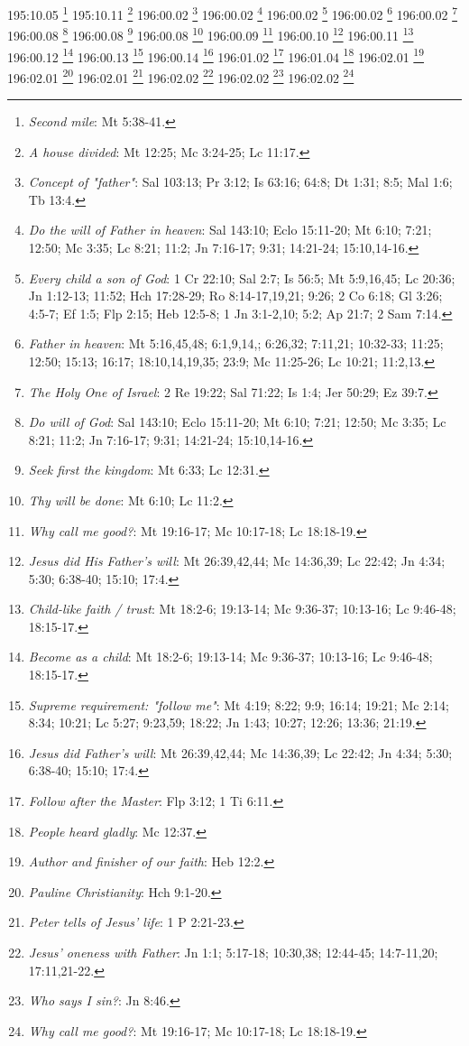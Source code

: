 195:10.05 \footnote{\textit{Second mile}: Mt 5:38-41.}
195:10.11 \footnote{\textit{A house divided}: Mt 12:25; Mc 3:24-25; Lc 11:17.}
196:00.02 \footnote{\textit{Concept of "father"}: Sal 103:13; Pr 3:12; Is 63:16; 64:8; Dt 1:31; 8:5; Mal 1:6; Tb 13:4.}
196:00.02 \footnote{\textit{Do the will of Father in heaven}: Sal 143:10; Eclo 15:11-20; Mt 6:10; 7:21; 12:50; Mc 3:35; Lc 8:21; 11:2; Jn 7:16-17; 9:31; 14:21-24; 15:10,14-16.}
196:00.02 \footnote{\textit{Every child a son of God}: 1 Cr 22:10; Sal 2:7; Is 56:5; Mt 5:9,16,45; Lc 20:36; Jn 1:12-13; 11:52; Hch 17:28-29; Ro 8:14-17,19,21; 9:26; 2 Co 6:18; Gl 3:26; 4:5-7; Ef 1:5; Flp 2:15; Heb 12:5-8; 1 Jn 3:1-2,10; 5:2; Ap 21:7; 2 Sam 7:14.}
196:00.02 \footnote{\textit{Father in heaven}: Mt 5:16,45,48; 6:1,9,14,; 6:26,32; 7:11,21; 10:32-33; 11:25; 12:50; 15:13; 16:17; 18:10,14,19,35; 23:9; Mc 11:25-26; Lc 10:21; 11:2,13.}
196:00.02 \footnote{\textit{The Holy One of Israel}: 2 Re 19:22; Sal 71:22; Is 1:4; Jer 50:29; Ez 39:7.}
196:00.08 \footnote{\textit{Do will of God}: Sal 143:10; Eclo 15:11-20; Mt 6:10; 7:21; 12:50; Mc 3:35; Lc 8:21; 11:2; Jn 7:16-17; 9:31; 14:21-24; 15:10,14-16.}
196:00.08 \footnote{\textit{Seek first the kingdom}: Mt 6:33; Lc 12:31.}
196:00.08 \footnote{\textit{Thy will be done}: Mt 6:10; Lc 11:2.}
196:00.09 \footnote{\textit{Why call me good?}: Mt 19:16-17; Mc 10:17-18; Lc 18:18-19.}
196:00.10 \footnote{\textit{Jesus did His Father's will}: Mt 26:39,42,44; Mc 14:36,39; Lc 22:42; Jn 4:34; 5:30; 6:38-40; 15:10; 17:4.}
196:00.11 \footnote{\textit{Child-like faith / trust}: Mt 18:2-6; 19:13-14; Mc 9:36-37; 10:13-16; Lc 9:46-48; 18:15-17.}
196:00.12 \footnote{\textit{Become as a child}: Mt 18:2-6; 19:13-14; Mc 9:36-37; 10:13-16; Lc 9:46-48; 18:15-17.}
196:00.13 \footnote{\textit{Supreme requirement: "follow me"}: Mt 4:19; 8:22; 9:9; 16:14; 19:21; Mc 2:14; 8:34; 10:21; Lc 5:27; 9:23,59; 18:22; Jn 1:43; 10:27; 12:26; 13:36; 21:19.}
196:00.14 \footnote{\textit{Jesus did Father's will}: Mt 26:39,42,44; Mc 14:36,39; Lc 22:42; Jn 4:34; 5:30; 6:38-40; 15:10; 17:4.}
196:01.02 \footnote{\textit{Follow after the Master}: Flp 3:12; 1 Ti 6:11.}
196:01.04 \footnote{\textit{People heard gladly}: Mc 12:37.}
196:02.01 \footnote{\textit{Author and finisher of our faith}: Heb 12:2.}
196:02.01 \footnote{\textit{Pauline Christianity}: Hch 9:1-20.}
196:02.01 \footnote{\textit{Peter tells of Jesus' life}: 1 P 2:21-23.}
196:02.02 \footnote{\textit{Jesus' oneness with Father}: Jn 1:1; 5:17-18; 10:30,38; 12:44-45; 14:7-11,20; 17:11,21-22.}
196:02.02 \footnote{\textit{Who says I sin?}: Jn 8:46.}
196:02.02 \footnote{\textit{Why call me good?}: Mt 19:16-17; Mc 10:17-18; Lc 18:18-19.}
